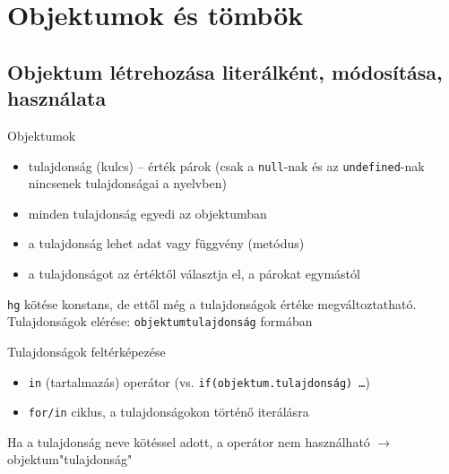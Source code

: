 \section{Objektumok és tömbök}

\subsection{Objektum létrehozása literálként, módosítása, használata}

\begin{frame}
  \small
  Objektumok
  \begin{itemize}
    \item tulajdonság (kulcs) -- érték párok (csak a \texttt{null}-nak és az \texttt{undefined}-nak nincsenek tulajdonságai a nyelvben)
    \item minden tulajdonság egyedi az objektumban
    \item a tulajdonság lehet adat vagy függvény (metódus)
    \item a tulajdonságot az értéktől \kiemel{:} választja el, a párokat egymástól \kiemel{,}
  \end{itemize}
  \begin{exampleblock}{}
    \vspace{-0.3cm}
    
    \vspace{-0.3cm}
  \end{exampleblock}
\end{frame}

\begin{frame}
  \texttt{hg} kötése konstans, de ettől még a tulajdonságok értéke megváltoztatható.\\
  Tulajdonságok elérése: \texttt{objektumtulajdonság} formában
  \footnotesize
  \begin{exampleblock}{}
    
  \end{exampleblock}
\end{frame}

\begin{frame}
  \small
  \begin{exampleblock}{}
    
  \end{exampleblock}
  \normalsize
  Tulajdonságok feltérképezése
  \begin{itemize}
    \item \texttt{in} (tartalmazás) operátor (vs. \texttt{if(objektum.tulajdonság) \dots})
    \item \texttt{for/in} ciklus, a tulajdonságokon történő iterálásra
  \end{itemize}
  Ha a tulajdonság neve kötéssel adott, a  operátor nem használható $\to$ objektum\kiemel{[}"tulajdonság"\kiemel{]}
\end{frame}

